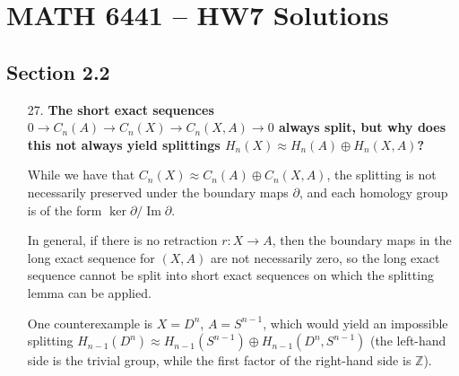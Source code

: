 \documentclass[a4paper,12pt]{article}
\DeclareMathOperator{\im}{Im}
\begin{document}
\section*{MATH 6441 -- HW7 Solutions}
\subsection*{Section 2.2}
\begin{enumerate}
    \item[27.]
        \boldmath\textbf{The short exact sequences $0 \to C_n(A) \to C_n(X) \to C_n(X, A) \to 0$ always split, but why does this not always yield splittings $H_n(X) \approx H_n(A) \oplus H_n(X, A)$?
        }\unboldmath \par
        While we have that $C_n(X) \approx C_n(A) \oplus C_n(X, A)$, the splitting is not necessarily preserved under the boundary maps $\partial$, and each homology group is of the form $\ker\partial / \im\partial$. \par
        In general, if there is no retraction $r : X \to A$, then the boundary maps in the long exact sequence for $(X, A)$ are not necessarily zero, so the long exact sequence cannot be split into short exact sequences on which the splitting lemma can be applied. \par
        One counterexample is $X = D^n$, $A = S^{n - 1}$, which would yield an impossible splitting $H_{n - 1}(D^n) \approx H_{n - 1}(S^{n - 1}) \oplus H_{n - 1}(D^n, S^{n - 1})$ (the left-hand side is the trivial group, while the first factor of the right-hand side is $\mathbb{Z}$).
\end{enumerate}
\end{document}
